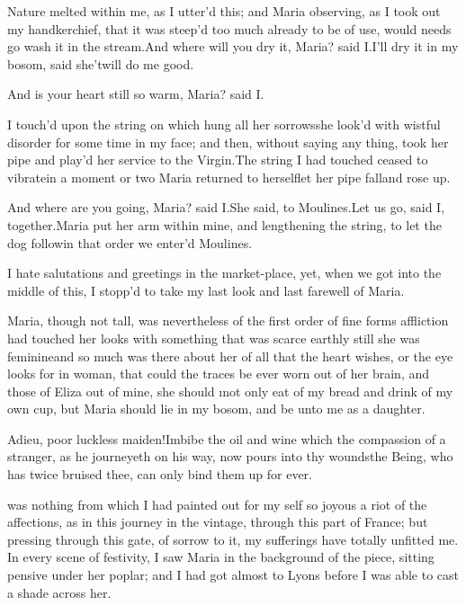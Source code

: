 \documentclass[twoside]{article}
\begin{document}
Nature melted within me, as I utter’d
this; and Maria observing, as I took out
my handkerchief, that it was steep’d too
much already to be of use, would needs go
wash it in the stream.\tskk And where will
you dry it, Maria? said I.\tskk I’ll dry
it in my bosom, said she\tskk ’twill do
me good.

And is your heart still so warm, Maria?
said I.

I touch’d upon the string on which hung
all her sorrows\tskk she look’d with
wistful disorder for some time in my face;
and then, without saying any thing, took
her pipe and play’d her service to the
Virgin.\tskk The string I had touched
ceased to vibrate\tskk in a moment or two
Maria returned to herself\tskk let her
pipe fall\tskk and rose up.

And where are you going, Maria? said
I.\tskk She said, to Moulines.\tskk Let us
go, said I, together.\tskk Maria put her
arm within mine, and lengthening the
string, to let the dog follow\tskk in
that order we enter’d Moulines.





\vskip 6pt


 I hate salutations and
greetings in the market-place, yet, when
we got into the middle of this, I stopp’d
to take my last look and last farewell of
Maria.

Maria, though not tall, was nevertheless
of the first order of fine forms\tskk
affliction had touched her looks with
something that was scarce earthly\tskk
still she was feminine\tskk and so much
was there about her of all that the heart
wishes, or the eye looks for in woman,
that could the traces be ever worn out of
her brain, and those of Eliza out of mine,
she should \i{not only eat of my bread and
drink of my own cup}, but Maria should lie
in my bosom, and be unto me as a daughter.

Adieu, poor luckless maiden!\tskk Imbibe
the oil and wine which the compassion of a
stranger, as he journeyeth on his way, now
pours into thy wounds\tskk the Being, who
has twice bruised thee, can only bind them
up for ever.





\vskip 6pt


 was nothing from which I
had painted out for my self so joyous a
riot of the affections, as in this journey
in the vintage, through this part of
France; but pressing through this gate, of
sorrow to it, my sufferings have totally
unfitted me.  In every scene of festivity,
I saw Maria in the background of the
piece, sitting pensive under her poplar;
and I had got almost to Lyons before I was
able to cast a shade across her.
\end{document}
